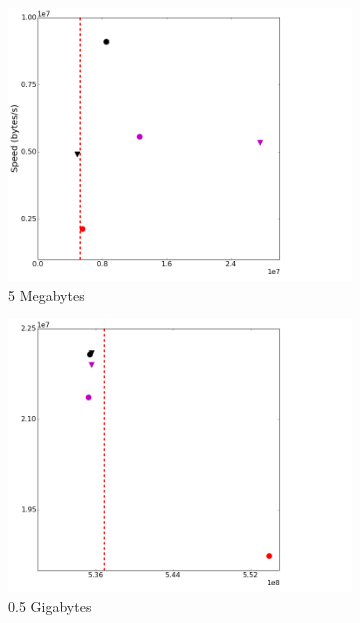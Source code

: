 \documentclass{sig-alternate-05-2015}
\begin{document}
\begin{figure}[t]
\centering
	\begin{subfigure}{.3\linewidth}
	\includegraphics[width=\linewidth]{img/speed_bytes/5M.png}
	\caption{5 Megabytes}
	\label{speed_bytes_5M}
	\end{subfigure}
	\begin{subfigure}{.3\linewidth}
	\includegraphics[width=\linewidth]{img/speed_bytes/512M.png}
	\caption{0.5 Gigabytes}
	\label{speed_bytes_512M}
	\end{subfigure}
	\begin{subfigure}{.3\linewidth}

\end{subfigure}
\end{figure}
\end{document}
